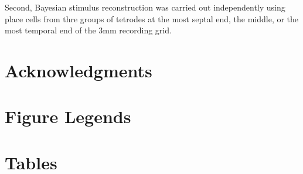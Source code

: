 \documentclass[10pt]{article}
\begin{document}
Second, Bayesian stimulus reconstruction was carried out independently using place cells from thre groups of tetrodes at the most septal end, the middle, or the most temporal end of the 3mm recording grid.

\section*{Acknowledgments}




\section*{Figure Legends}


\section*{Tables}
\end{document}
